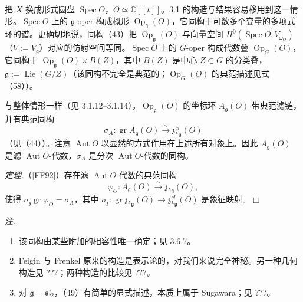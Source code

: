 
 把 $X$ 换成形式圆盘 $\operatorname{Spec} O$，$O \simeq \mathbb{C}[[t]]$。3.1 的构造与结果容易移用到这一情形。$\operatorname{Spec} O$ 上的 $\mathfrak{g}$-oper 构成概形 $\operatorname{Op}_{\mathfrak{g}}(O)$，它同构于可数多个变量的多项式环的谱。更确切地说，同构（43）把 $\operatorname{Op}_{\mathfrak{g}}(O)$ 与向量空间 $H^0(\operatorname{Spec} O,V_{\omega_O})$（$V := V_{\mathfrak{g}}$）对应的仿射空间等同。$\operatorname{Spec} O$ 上的 $G$-oper 构成代数叠 $\operatorname{Op}_G(O)$，它同构于 $\operatorname{Op}_{\mathfrak{g}}(O) \times B(Z)$，其中 $B(Z)$ 是中心 $Z \subset G$ 的分类叠，$\mathfrak{g} := \operatorname{Lie}(G/Z)$（该同构不完全是典范的；$\operatorname{Op}_G(O)$ 的典范描述见式（58））。


与整体情形一样（见 3.1.12--3.1.14），$\operatorname{Op}_{\mathfrak{g}}(O)$ 的坐标环 $A_{\mathfrak{g}}(O)$ 带典范滤链，并有典范同构
\begin{equation}\tag{48}
\sigma_A: \operatorname{gr} A_{\mathfrak{g}}(O) \xrightarrow{\sim} \mathfrak{z}^{cl}_{{}^{L}\mathfrak{g}}(O)
\end{equation}
（见（44））。注意 $\operatorname{Aut} O$ 以显然的方式作用在上述所有对象上。因此 $A_{\mathfrak{g}}(O)$ 是滤 $\operatorname{Aut} O$-代数，$\sigma_A$ 是分次 $\operatorname{Aut} O$-代数的同构。

 \emph{定理.}（[FF92]）存在滤 $\operatorname{Aut} O$-代数的典范同构
\begin{equation}\tag{49}
\varphi_O: A_{\mathfrak{g}}(O) \xrightarrow{\sim} \mathfrak{z}_{{}^{L}\mathfrak{g}}(O),
\end{equation}
使得 $\sigma_{\mathfrak{z}}\operatorname{gr}\varphi_O = \sigma_A$，其中 $\sigma_{\mathfrak{z}}: \operatorname{gr}\mathfrak{z}_{{}^{L}\mathfrak{g}}(O) \to \mathfrak{z}^{cl}_{{}^{L}\mathfrak{g}}(O)$ 是象征映射。\hfill$\Box$

\emph{注.}
\begin{enumerate}[label=(\roman*),leftmargin=2.2em]
\item 该同构由某些附加的相容性唯一确定；见 3.6.7。
\item Feigin 与 Frenkel 原来的构造是表示论的，对我们来说完全神秘。另一种几何构造见 ???；两种构造的比较见 ???。
\item 对 $\mathfrak{g} = \mathfrak{sl}_2$，（49）有简单的显式描述，本质上属于 Sugawara；见 ???。
\end{enumerate}

